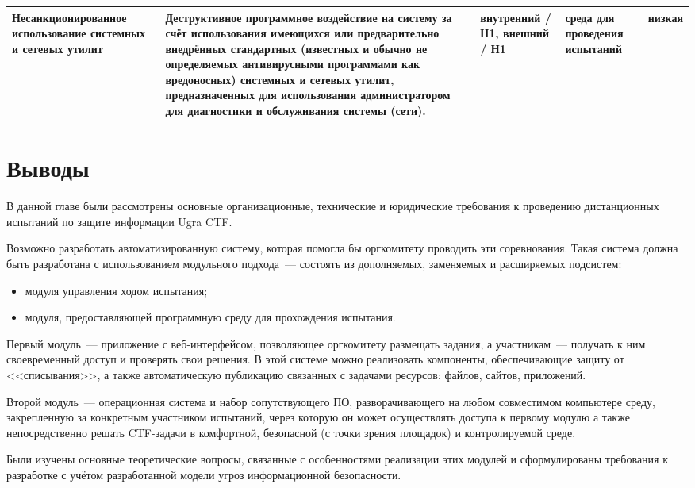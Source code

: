 \begin{landscape}
\begin{longtable}{|p{5cm}|p{9cm}|p{3cm}|p{2.5cm}|p{5cm}|}
    Несанкционированное использование системных и сетевых утилит &
    Деструктивное программное воздействие на систему за счёт использования имеющихся или предварительно внедрённых стандартных (известных и обычно не определяемых антивирусными программами как вредоносных) системных и сетевых утилит, предназначенных для использования администратором для диагностики и обслуживания системы (сети). &
    внутренний / Н1, внешний / Н1 &
    среда для проведения испытаний &
    низкая
    \\ \hline

  \end{longtable}
\end{landscape}

\section{Выводы}

В данной главе были рассмотрены основные организационные, технические и юридические требования к проведению дистанционных испытаний по защите информации Ugra CTF.

Возможно разработать автоматизированную систему, которая помогла бы оргкомитету проводить эти соревнования. Такая система должна быть разработана с использованием модульного подхода~--- состоять из дополняемых, заменяемых и расширяемых подсистем:

\begin{itemize}
\item модуля управления ходом испытания;
\item модуля, предоставляющей программную среду для прохождения испытания.
\end{itemize}

Первый модуль~--- приложение с веб-интерфейсом, позволяющее оргкомитету размещать задания, а участникам~--- получать к ним своевременный доступ и проверять свои решения. В этой системе можно реализовать компоненты, обеспечивающие защиту от <<списывания>>, а также автоматическую публикацию связанных с задачами ресурсов: файлов, сайтов, приложений.

Второй модуль~--- операционная система и набор сопутствующего ПО, разворачивающего на любом совместимом компьютере среду, закрепленную за конкретным участником испытаний, через которую он может осуществлять доступа к первому модулю а также непосредственно решать CTF-задачи в комфортной, безопасной (с точки зрения площадок) и контролируемой среде.

Были изучены основные теоретические вопросы, связанные с особенностями реализации этих модулей и сформулированы требования к разработке с учётом разработанной модели угроз информационной безопасности.

